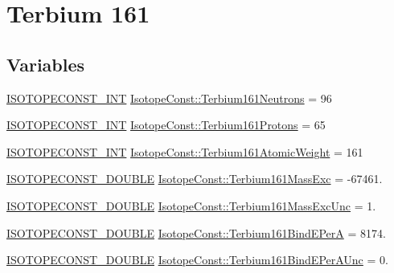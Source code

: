 \hypertarget{group___isotope_const-_terbium-_tb161}{}\section{Terbium 161}
\label{group___isotope_const-_terbium-_tb161}
\subsection*{Variables}
\begin{DoxyCompactItemize}
\item 
\mbox{\hyperlink{group___isotope_const-_macros_ga5f18360b3e99483a35c32d789e62621c}{I\+S\+O\+T\+O\+P\+E\+C\+O\+N\+S\+T\+\_\+\+I\+NT}} \mbox{\hyperlink{group___isotope_const-_terbium-_tb161_gac19994046300f7e82c99672f38125c65}{Isotope\+Const\+::\+Terbium161\+Neutrons}} = 96
\item 
\mbox{\hyperlink{group___isotope_const-_macros_ga5f18360b3e99483a35c32d789e62621c}{I\+S\+O\+T\+O\+P\+E\+C\+O\+N\+S\+T\+\_\+\+I\+NT}} \mbox{\hyperlink{group___isotope_const-_terbium-_tb161_ga19373937025636d48bfc7b0deca6b08e}{Isotope\+Const\+::\+Terbium161\+Protons}} = 65
\item 
\mbox{\hyperlink{group___isotope_const-_macros_ga5f18360b3e99483a35c32d789e62621c}{I\+S\+O\+T\+O\+P\+E\+C\+O\+N\+S\+T\+\_\+\+I\+NT}} \mbox{\hyperlink{group___isotope_const-_terbium-_tb161_ga8797937c38d77882d36257a4cd5a82dd}{Isotope\+Const\+::\+Terbium161\+Atomic\+Weight}} = 161
\item 
\mbox{\hyperlink{group___isotope_const-_macros_ga8f45a7272ce02c0b4c65c44636ed719a}{I\+S\+O\+T\+O\+P\+E\+C\+O\+N\+S\+T\+\_\+\+D\+O\+U\+B\+LE}} \mbox{\hyperlink{group___isotope_const-_terbium-_tb161_ga52f45da632c253e86883e6454250eee2}{Isotope\+Const\+::\+Terbium161\+Mass\+Exc}} = -\/67461.
\item 
\mbox{\hyperlink{group___isotope_const-_macros_ga8f45a7272ce02c0b4c65c44636ed719a}{I\+S\+O\+T\+O\+P\+E\+C\+O\+N\+S\+T\+\_\+\+D\+O\+U\+B\+LE}} \mbox{\hyperlink{group___isotope_const-_terbium-_tb161_ga2d929401bd2f9c1f2cdc3834029c97c9}{Isotope\+Const\+::\+Terbium161\+Mass\+Exc\+Unc}} = 1.
\item 
\mbox{\hyperlink{group___isotope_const-_macros_ga8f45a7272ce02c0b4c65c44636ed719a}{I\+S\+O\+T\+O\+P\+E\+C\+O\+N\+S\+T\+\_\+\+D\+O\+U\+B\+LE}} \mbox{\hyperlink{group___isotope_const-_terbium-_tb161_gafec99aecbc431defc64ef43046da51a9}{Isotope\+Const\+::\+Terbium161\+Bind\+E\+PerA}} = 8174.
\item 
\mbox{\hyperlink{group___isotope_const-_macros_ga8f45a7272ce02c0b4c65c44636ed719a}{I\+S\+O\+T\+O\+P\+E\+C\+O\+N\+S\+T\+\_\+\+D\+O\+U\+B\+LE}} \mbox{\hyperlink{group___isotope_const-_terbium-_tb161_ga01f44af01edd35eca4c45d88cdb9fe5a}{Isotope\+Const\+::\+Terbium161\+Bind\+E\+Per\+A\+Unc}} = 0.

\end{DoxyCompactItemize}
